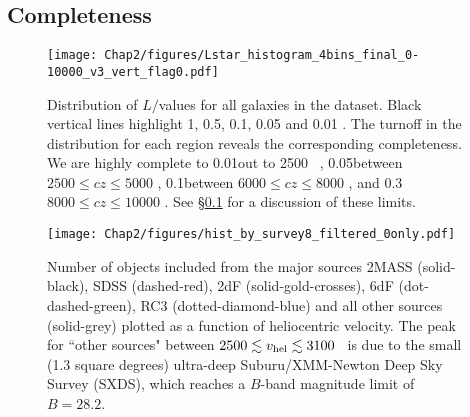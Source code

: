 \subsection{Completeness} \label{completeness}

\begin{figure}[ht!]
        \centering
        \vspace{0pt}
        \texttt{[image: Chap2/figures/Lstar\_histogram\_4bins\_final\_0-10000\_v3\_vert\_flag0.pdf]}
        \caption{\small{Distribution of $L/$\Lstar values  for all galaxies in the dataset. Black vertical lines highlight 1, 0.5, 0.1, 0.05 and 0.01 \Lstar. The turnoff in the distribution for each region reveals the corresponding completeness. We are highly complete to 0.01\Lstar out to 2500 \kms~, 0.05\Lstar between $2500 \leq cz \leq 5000$ \kms, 0.1\Lstar between $6000 \leq cz \leq 8000$ \kms, and 0.3\Lstar $8000 \leq cz \leq 10000$ \kms. See \S \ref{completeness} for a discussion of these limits.}}
        \vspace{5pt}
        \label{completeness_plot}
\end{figure} 

\begin{figure}[ht!]
        \centering
        \vspace{0pt}
        \texttt{[image: Chap2/figures/hist\_by\_survey8\_filtered\_0only.pdf]}
        \caption{\small{Number of objects included from the major sources 2MASS (solid-black), SDSS (dashed-red), 2dF (solid-gold-crosses), 6dF (dot-dashed-green), RC3 (dotted-diamond-blue) and all other sources (solid-grey) plotted as a function of heliocentric velocity. The peak for ``other sources" between $2500 \lesssim v_{\rm hel} \lesssim 3100$ \kms~is due to the small (1.3 square degrees) ultra-deep Suburu/XMM-Newton Deep Sky Survey (SXDS), which reaches a $B$-band magnitude limit of $B=28.2$.}}
        \vspace{5pt}
        \label{source_histograms}
\end{figure} 




